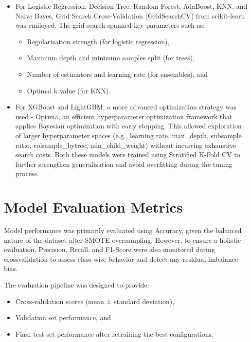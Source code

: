 \begin{itemize}
    \item For Logistic Regression, Decision Tree, Random Forest, AdaBoost, KNN, and Naive Bayes, Grid Search Cross-Validation (GridSearchCV) from scikit-learn was emiloyed.
    The grid search spanned key parameters such as:
    \begin{itemize}
        \item Regularization strength (for logistic regression),
        \item Maximum depth and minimum samples split (for trees),
        \item Number of estimators and learning rate (for ensembles), and
        \item Optimal k value (for KNN).
    \end{itemize}

    \item For XGBoost and LightGBM, a more advanced optimization strategy was used - Optuna, an efficient hyperparameter optimization framework that applies Bayesian optimization with early stopping.
    This allowed exploration of larger hyperparameter spaces (e.g., learning rate, max\_depth, subsample ratio, colsample\_bytree, min\_child\_weight) without incurring exhaustive search costs.
    Both these models were trained using Stratified K-Fold CV to further strengthen generalization and avoid overfitting during the tuning process.
\end{itemize}


\section{Model Evaluation Metrics}\label{sec:model-evaluation-metrics}

Model performance was primarily evaluated using Accuracy, given the balanced nature of the dataset after SMOTE oversampling.
However, to ensure a holistic evaluation, Precision, Recall, and F1-Score were also monitored during crossvalidation to assess class-wise behavior and detect any residual imbalance bias.

The evaluation pipeline was designed to provide:

\begin{itemize}
    \item Cross-validation scores (mean ± standard deviation),
    \item Validation set performance, and
    \item Final test set performance after retraining the best configurations.
\end{itemize}

